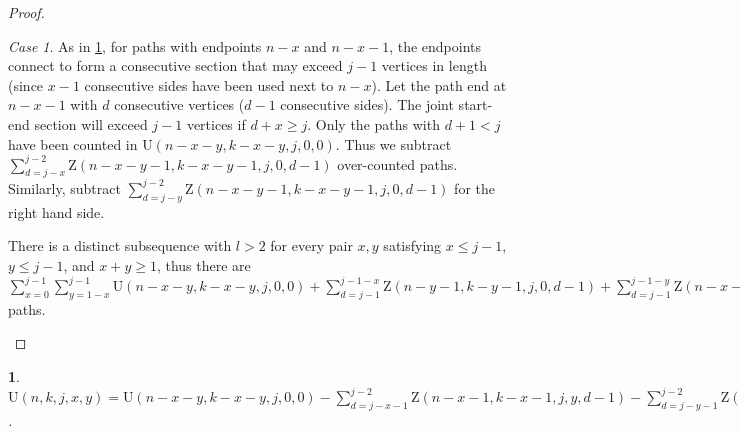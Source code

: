 \documentclass[a4paper, 12pt] {article}
\theoremstyle{remark}
\newtheorem*{remark}{Remark}
\theoremstyle{plain}
\newcommand{\thistheoremname}{}
\newtheorem{genericthm}[theorem]{\thistheoremname}
\newenvironment{namedthm}[1]
  {\renewcommand{\thistheoremname}{#1}
   \begin{genericthm}}
  {\end{genericthm}}
\theoremstyle{remark}
\newtheorem{case}{Case}
\begin{document}
\begin{proof}
\begin{case}
As in \ref{side_removal_u}, for paths with endpoints $n-x$ and $n-x-1$, the endpoints connect to form a consecutive section that may exceed $j-1$ vertices in length (since $x-1$ consecutive sides have been used next to $n-x$). Let the path end at $n-x-1$ with $d$ consecutive vertices ($d-1$ consecutive sides). The joint start-end section will exceed $j-1$ vertices if $d+x \geq j$. Only the paths with $d+1<j$ have been counted in $\mathrm{U}(n-x-y,k-x-y,j,0,0)$. Thus we subtract $\sum_{d=j-x}^{j-2} \mathrm{Z}(n-x-y-1,k-x-y-1,j,0,d-1)$ over-counted paths. Similarly, subtract $\sum_{d=j-y}^{j-2} \mathrm{Z}(n-x-y-1,k-x-y-1,j,0,d-1)$ for the right hand side.
\begin{comment}
$n-x$ is treated as a vertex (length $1$) in the reduced polygon even if $x>1$, in which case its true length prior to reduction is $x$ vertices. 
The paths starting at $1+y$ with $0$ consecutive sides and ending at $n-x-1$ with $d$ consecutive vertices where $d+1<j$ and $d+x \geq j$ (or starting at $n-x-1$ with $d$ consecutive vertices and ending at $1+y$ with $0$ consecutive sides) do not meet the consecutivity restriction but have been counted in $\mathrm{U}(n-x-y,k-x-y,j,0,0)$, so subtract $\sum_{d=j-x}^{j-2} \mathrm{Z}(n-x-y-1,k-x-y-1,j,0,d-1)$. Similarly, subtract $\sum_{d=j-y}^{j-2} \mathrm{Z}(n-x-y-1,k-x-y-1,j,0,d-1)$ for the right hand side.
\begin{remark}
If $y=0$, $(n,2)$ isn't used, thus the starting vertex can be shifted to $1$ as in case \ref{vertex_merge_u_leq2} without affecting path count.
\end{remark}
\end{comment}

There is a distinct subsequence with $l>2$ for every pair $x, y$ satisfying $x \leq j-1$, $y \leq j-1$, and $x+y \geq 1$, thus there are $\sum_{x=0}^{j-1} \sum_{y=1-x}^{j-1} \mathrm{U}(n-x-y,k-x-y,j,0,0)+\sum_{d=j-1}^{j-1-x} \mathrm{Z}(n-y-1,k-y-1,j,0,d-1)+\sum_{d=j-1}^{j-1-y} \mathrm{Z}(n-x-1,k-x-1,j,0,d-1)-\sum_{d=j-x}^{j-2} \mathrm{Z}(n-x-y-1,k-x-y-1,j,0,d-1)-\sum_{d=j-y}^{j-2} \mathrm{Z}(n-x-y-1,k-x-y-1,j,0,d-1)$ paths.
\end{case}

\end{proof}


\begin{namedthm}{Side Removal Theorem U}
\label{side_removal_u}
$\mathrm{U}(n,k,j,x,y)=\mathrm{U}(n-x-y,k-x-y,j,0,0)-\sum_{d=j-x-1}^{j-2} \mathrm{Z}(n-x-1,k-x-1,j,y,d-1)-\sum_{d=j-y-1}^{j-2} \mathrm{Z}(n-y-1,k-y-1,j,x,d-1)$.
\end{namedthm}
\end{document}
